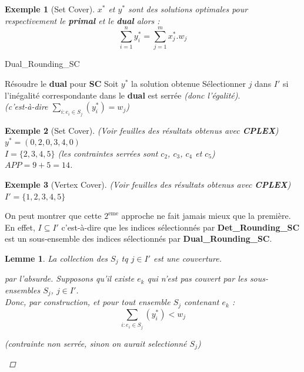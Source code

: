 \documentclass{article}
\newcommand{\titre}[1]{\textcolor{title}{#1}}
\newtheorem{exemple}{Exemple}[section]
\newtheorem{lemme}{Lemme}[section]
\newtheorem{proof}{Preuve}[section]
\begin{document}
\begin{sffamily}
\begin{exemple}[Set Cover]
$x^*$ et $y^*$ sont des solutions optimales pour respectivement le \textbf{primal} et le \textbf{dual} alors :
$$ \sum_{i=1}^n y^*_i = \sum_{j=1}^m x^*_j.w_j$$
\end{exemple}

\begin{algorithm}[h!]
\caption{Dual\_Rounding\_SC}
\begin{algorithmic}[1]
\STATE Résoudre le \textbf{dual} pour \textbf{\titre{SC}}
\STATE Soit $y^*$ la solution obtenue
\STATE Sélectionner $j$ dans $I'$ si l'inégalité correspondante dans le \textbf{dual} est serrée \textit{(donc l'égalité)}.\\
\textit{(c'est-à-dire $\sum_{i : e_i \in S_j} (y^*_i) = w_j$)}
\end{algorithmic}
\end{algorithm}

\begin{exemple}[Set Cover] (Voir feuilles des résultats obtenus avec \textbf{CPLEX}) \\
$y^* = (0,2,0,3,4,0)$ \\
$I = \{2,3,4,5\}$ (les contraintes serrées sont $c_2$, $c_3$, $c_4$ et $c_5$)\\
$APP=9+5=14$.
\end{exemple}

\begin{exemple}[Vertex Cover] (Voir feuilles des résultats obtenus avec \textbf{CPLEX}) \\
$I' = \{1,2,3,4,5\}$
\end{exemple}

On peut montrer que cette $2^{\text{eme}}$ approche ne fait jamais mieux que la première. En effet, $I \subseteq I'$ c'est-à-dire que les 
indices sélectionnés par \textbf{Det\_Rounding\_SC} est un sous-ensemble des indices sélectionnés par \textbf{Dual\_Rounding\_SC}.

\begin{lemme}
La collection des $S_j$ tq $j\in I'$ est une couverture.$ $\\
\begin{proof}[par l'absurde]
Supposons qu'il existe $e_k$ qui n'est pas couvert par les sous-ensembles $S_j$, $j\in I'$.\\
Donc, par construction, et pour tout ensemble $S_j$ contenant $e_k$ :
$$\sum_{i : e_i \in S_j}(y^*_i) < w_j $$
\begin{center}
\textit{(contrainte non serrée, sinon on aurait selectionné $S_j$)}
\end{center}


\end{proof}
\end{lemme}
\end{sffamily}
\end{document}
